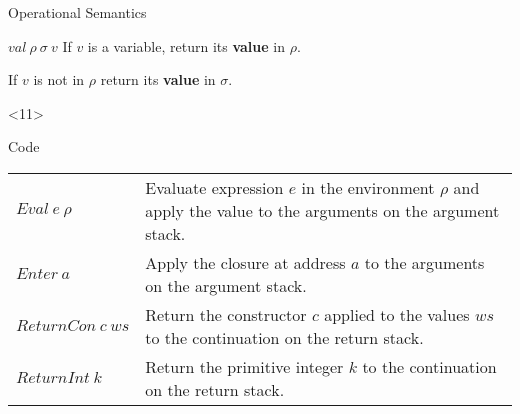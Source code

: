 \documentclass{beamer}
\begin{document}
\begin{frame}[fragile]{Operational Semantics}
\begin{onlyenv}
\begin{block}{$val\ \rho\ \sigma\ v$}
      If $v$ is a variable, return its \textbf{value} in $\rho$.

      If $v$ is not in $\rho$ return its \textbf{value} in $\sigma$.
    \end{block}
  \end{onlyenv}

  \begin{onlyenv}<11>
    \begin{block}{Code}
      \begin{tabular}{ l p{6cm} }
        $Eval\ e\ \rho$ & Evaluate expression $e$ in the environment
                          $\rho$ and apply the value to the arguments
                          on the argument stack. \\
        $Enter\ a$ & Apply the closure at address $a$ to the arguments
                     on the argument stack. \\
        $ReturnCon\ c\ ws$ & Return the constructor $c$ applied to the
                             values $ws$ to the continuation on the
                             return stack. \\
        $ReturnInt\ k$ & Return the primitive integer $k$ to the
                         continuation on the return stack. \\
      \end{tabular}
    \end{block}
  \end{onlyenv}
\end{frame}
\end{document}
